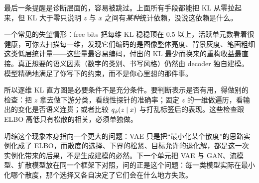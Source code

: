 最后一条提醒是诊断层面的，容易被跳过。上面所有手段都能把 KL 从零拉起来，但 KL 大于零只说明 \(z\) 与 \(x\) 之间有\emph{某种}统计依赖，没说这依赖是什么。

一个常见的失望情形：free bits 把每维 KL 稳稳顶在 \(0.5\) 以上，活跃单元数看着很健康，可你去扫描每一维，发现它们编码的是图像整体亮度、背景灰度、笔画粗细这类低层统计量——这些量最容易编码，付出的 KL 最少而换来的重构收益最直接。真正想要的语义因素（数字的类别、书写风格）仍然由 decoder 独自建模。模型精确地满足了你写下的约束，而不是你心里想的那件事。

所以逐维 KL 直方图是必要条件不是充分条件。要判断表示是否有用，得做别的检查：把 \(z\) 拿去做下游分类，看线性探针的准确率；固定 \(z\) 的一维做遍历，看输出的变化是否语义连贯；或者比较 \(q_\phi(z\mid x)\) 与打乱标签后的表现。这些检查跟 ELBO 高低只有松散的相关，必须单独做。

坍缩这个现象本身指向一个更大的问题：VAE 只是把``最小化某个散度''的思路实例化成了 ELBO，而散度的选择、下界的松紧、目标允许的退化解，都是这一次实例化带来的后果，不是生成建模的必然。下一个单元把 VAE 与 GAN、流模型、扩散模型放在同一个框架下对照，问的正是这个问题：每一类模型实际在最小化哪个散度，那个选择又各自决定了它们会在什么地方失败。
